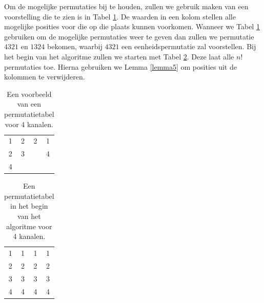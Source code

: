 \documentclass{article}
\begin{document}
Om de mogelijke permutaties bij te houden, zullen we gebruik maken van een voorstelling die te zien is in Tabel \ref{tabel4}.
De waarden in een kolom stellen alle mogelijke posities voor die op die plaats kunnen voorkomen.
Wanneer we Tabel  \ref{tabel4} gebruiken om de mogelijke permutaties weer te geven dan zullen we permutatie $4321$ en $1324$  bekomen, waarbij $4321$ een eenheidspermutatie zal voorstellen.
Bij het begin van het algoritme zullen we starten met Tabel \ref{tabel5}.
Deze laat alle $n!$ permutaties toe.
Hierna gebruiken we Lemma \ref{lemma5} om posities uit de kolommen te verwijderen.
\begin{table}[!h]
	\vspace{-5pt}
	\centering
	\begin{tabular}{|c|c|c|c|}
	\hline
	1 & 2 & 2 & 1 \\ 
	2 & 3 &  &  4\\ 
	4 &  &  &  \\ 
	\hline 
	\end{tabular}
	\caption{Een voorbeeld van een permutatietabel voor 4 kanalen.}
	\label{tabel4}
\end{table}
\begin{table}[!h]
	\vspace{-25pt}
	\centering
	\begin{tabular}{|c|c|c|c|}
	\hline
	1 & 1 & 1 & 1 \\ 
	2 & 2 & 2 & 2\\ 
	3 & 3 & 3 & 3 \\
	4 & 4 & 4 & 4\\ 
	\hline 
	\end{tabular}
	\caption{Een permutatietabel in het begin van het algoritme voor 4 kanalen.}
\label{tabel5}
\end{table}
\end{document}

